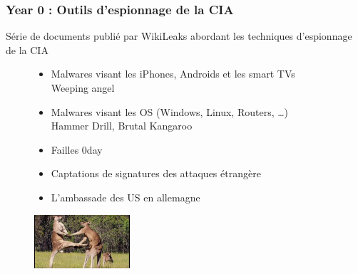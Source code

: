 \documentclass{beamer}
\begin{document}
		\begin{frame}
			\frametitle{Year 0 : Outils d'espionnage de la CIA}
			Série de documents publié par WikiLeaks abordant les techniques d'espionnage de la CIA
			\begin{figure}
				\begin{minipage}[c]{.58\linewidth}
					\begin{itemize}
						\item[\textbullet] Malwares visant les iPhones, Androids et les smart TVs\\
						Weeping angel
						\item[\textbullet] Malwares visant les OS (Windows, Linux, Routers, …) \\
						Hammer Drill, Brutal Kangaroo
						\item[\textbullet] Failles 0day
						\item[\textbullet] Captations de signatures des attaques étrangère
						\item[\textbullet] L’ambassade des US en allemagne
					\end{itemize}
				\end{minipage}
			\begin{minipage}[c]{.28\linewidth}
				\includegraphics[height=2cm]{kangourou.jpg}
			\end{minipage}
			\end{figure}	
		\end{frame}
		
\end{document}
